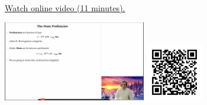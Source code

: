 
\begin{minipage}{10cm}
    \href{https://act4e-spring21.netlify.app/videos/spring2021-profunctors:hom-prof.html}{Watch online video (11 minutes).}
        
    \href{https://act4e-spring21.netlify.app/videos/spring2021-profunctors:hom-prof.html}{\includegraphics[height=3.5cm]{spring2021-profunctors:hom-prof/thumbnails.jpg}}
    \href{https://act4e-spring21.netlify.app/videos/spring2021-profunctors:hom-prof.html}{\includegraphics[height=2.5cm]{spring2021-profunctors:hom-prof/qrcode.png}}
\end{minipage}
